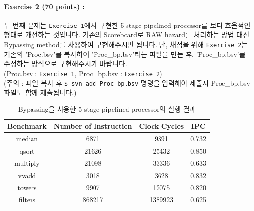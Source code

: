 \documentclass{article}
\begin{document}
\noindent \paragraph{\bf Exercise 2 (70 points) :} 두 번째 문제는 \texttt{Exercise 1}에서 구현한 5-stage pipelined processor를
보다 효율적인 형태로 개선하는 것입니다. 기존의 Scoreboard로 RAW hazard를 처리하는 방법 대신 Bypassing method를 사용하여
구현해주시면 됩니다. 단, 채점을 위해 \texttt{Exercise 2}는 기존의 'Proc.bsv'를 복사하여 'Proc\_bp.bsv'라는 파일을 만든 후,
'Proc\_bp.bsv'를 수정하는 방식으로 구현해주시기 바랍니다. 
\\(Proc.bsv : \texttt{Exercise 1},  Proc\_bp.bsv : \texttt{Exercise 2}) 
\\(주의 : 파일 복사 후 \texttt{\$ svn add Proc\_bp.bsv} 명령을 입력해야 제출시 Proc\_bp.bsv 파일도 함께 제출됩니다.)


\begin{table}[h]
\centering
\begin{tabular}{|c|c|c|c|}
\hline
Benchmark & Number of Instruction & Clock Cycles & IPC \\
\hline
median & 6871 & 9391 & 0.732\\
qsort & 21626 & 25432 & 0.850\\ 
multiply & 21098 & 33336 & 0.633\\
vvadd & 3018 & 3628 & 0.832\\
towers & 9907 & 12075 & 0.820\\
filters & 868217 & 1389923 & 0.625\\
\hline
\end{tabular}
\caption{Bypassing을 사용한 5-stage pipelined processor의 실행 결과}
\end{table}
\end{document}
